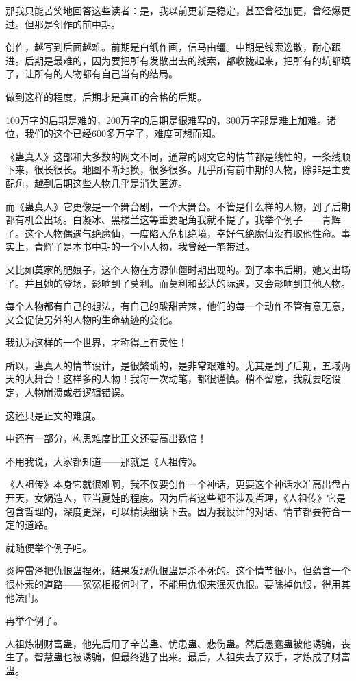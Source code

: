 \begin{this_body}
那我只能苦笑地回答这些读者：是，我以前更新是稳定，甚至曾经加更，曾经爆更过。但那是创作的前中期。

创作，越写到后面越难。前期是白纸作画，信马由缰。中期是线索逸散，耐心跟进。后期是最难的，因为要把所有发散出去的线索，都收拢起来，把所有的坑都填了，让所有的人物都有自己当有的结局。

做到这样的程度，后期才是真正的合格的后期。

100万字的后期是难的，200万字的后期是很难写的，300万字那是难上加难。诸位，我们的这个已经600多万字了，难度可想而知。

《蛊真人》这部和大多数的网文不同，通常的网文它的情节都是线性的，一条线顺下来，很长很长。地图不断地换，很多很多。几乎所有前中期的人物，除非是主要配角，越到后期这些人物几乎是消失匿迹。

而《蛊真人》它更像是一个舞台剧，一个大舞台。不管是什么样的人物，到了后期都有机会出场。白凝冰、黑楼兰这等重要配角我就不提了，我举个例子——青辉子。这个人物偶遇气绝魔仙，一度陷入危机绝境，幸好气绝魔仙没有取他性命。事实上，青辉子是本书中期的一个小人物，我曾经一笔带过。

又比如莫家的肥娘子，这个人物在方源仙僵时期出现的。到了本书后期，她又出场了。并且她的登场，影响到了莫利。而莫利和彭达的际遇，又会影响到其他人物。

每个人物都有自己的想法，有自己的酸甜苦辣，他们的每一个动作不管有意无意，又会促使另外的人物的生命轨迹的变化。

我认为这样的一个世界，才称得上有灵性！

所以，蛊真人的情节设计，是很繁琐的，是非常艰难的。尤其是到了后期，五域两天的大舞台！这样多的人物！我每一次动笔，都很谨慎。稍不留意，我就要吃设定，人物崩溃或者逻辑错误。

这还只是正文的难度。

中还有一部分，构思难度比正文还要高出数倍！

不用我说，大家都知道——那就是《人祖传》。

《人祖传》本身它就很难啊，我不仅要创作一个神话，更要这个神话水准高出盘古开天，女娲造人，亚当夏娃的程度。因为后者这些都不涉及哲理，《人祖传》它是包含哲理的，深度更深，可以精读细读下去。因为我设计的对话、情节都要符合一定的道路。

就随便举个例子吧。

炎煌雷泽把仇恨蛊捏死，结果发现仇恨蛊是杀不死的。这个情节很小，但蕴含一个很朴素的道路——冤冤相报何时了，不能用仇恨来泯灭仇恨。要除掉仇恨，得用其他法门。

再举个例子。

人祖炼制财富蛊，他先后用了辛苦蛊、忧患蛊、悲伤蛊。然后愚蠢蛊被他诱骗，丧生了。智慧蛊也被诱骗，但最终逃了出来。最后，人祖失去了双手，才炼成了财富蛊。


\end{this_body}
